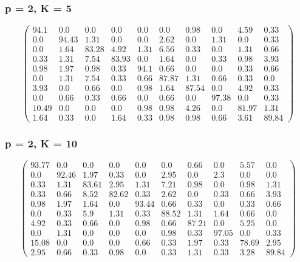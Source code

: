 \begin{appendices}
\subsubsection*{p = 2, K = 5}
$$\begin{pmatrix}
94.1&0.0&0.0&0.0&0.0&0.0&0.98&0.0&4.59&0.33\\
0.0&94.43&1.31&0.0&0.0&2.62&0.0&1.31&0.0&0.33\\
0.0&1.64&83.28&4.92&1.31&6.56&0.33&0.0&1.31&0.66\\
0.33&1.31&7.54&83.93&0.0&1.64&0.0&0.33&0.98&3.93\\
0.98&1.97&0.98&0.33&94.1&0.66&0.0&0.0&0.33&0.66\\
0.0&1.31&7.54&0.33&0.66&87.87&1.31&0.66&0.33&0.0\\
3.93&0.0&0.66&0.0&0.98&1.64&87.54&0.0&4.92&0.33\\
0.0&0.66&0.33&0.66&0.0&0.66&0.0&97.38&0.0&0.33\\
10.49&0.0&0.0&0.0&0.98&0.98&4.26&0.0&81.97&1.31\\
1.64&0.33&0.0&1.64&0.33&0.98&0.98&0.66&3.61&89.84
\end{pmatrix}$$

\subsubsection*{p = 2, K = 10}
$$\begin{pmatrix}
93.77&0.0&0.0&0.0&0.0&0.0&0.66&0.0&5.57&0.0\\
0.0&92.46&1.97&0.33&0.0&2.95&0.0&2.3&0.0&0.0\\
0.33&1.31&83.61&2.95&1.31&7.21&0.98&0.0&0.98&1.31\\
0.33&0.66&8.52&82.62&0.33&2.62&0.0&0.33&0.66&3.93\\
0.98&1.97&1.64&0.0&93.44&0.66&0.33&0.0&0.33&0.66\\
0.0&0.33&5.9&1.31&0.33&88.52&1.31&1.64&0.66&0.0\\
4.92&0.33&0.66&0.0&0.98&0.66&87.21&0.0&5.25&0.0\\
0.0&1.31&0.0&0.0&0.0&0.98&0.33&97.05&0.0&0.33\\
15.08&0.0&0.0&0.0&0.66&0.33&1.97&0.33&78.69&2.95\\
2.95&0.66&0.33&0.98&0.0&0.33&1.31&0.33&3.28&89.84
\end{pmatrix}$$


\end{appendices}
